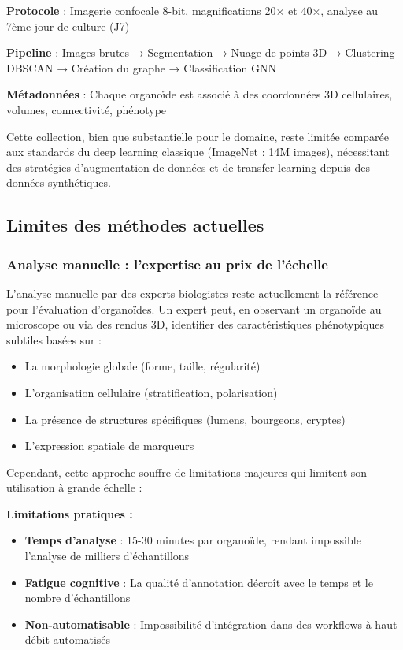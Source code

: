 \textbf{Protocole} : Imagerie confocale 8-bit, magnifications 20× et 40×, analyse au 7ème jour de culture (J7)

\textbf{Pipeline} : Images brutes → Segmentation → Nuage de points 3D → Clustering DBSCAN → Création du graphe → Classification GNN

\textbf{Métadonnées} : Chaque organoïde est associé à des coordonnées 3D cellulaires, volumes, connectivité, phénotype

Cette collection, bien que substantielle pour le domaine, reste limitée comparée aux standards du deep learning classique (ImageNet : 14M images), nécessitant des stratégies d'augmentation de données et de transfer learning depuis des données synthétiques.

\subsection{Limites des méthodes actuelles}

\subsubsection{Analyse manuelle : l'expertise au prix de l'échelle}

L'analyse manuelle par des experts biologistes reste actuellement la référence pour l'évaluation d'organoïdes. Un expert peut, en observant un organoïde au microscope ou via des rendus 3D, identifier des caractéristiques phénotypiques subtiles basées sur :
\begin{itemize}
    \item La morphologie globale (forme, taille, régularité)
    \item L'organisation cellulaire (stratification, polarisation)
    \item La présence de structures spécifiques (lumens, bourgeons, cryptes)
    \item L'expression spatiale de marqueurs
\end{itemize}

Cependant, cette approche souffre de limitations majeures qui limitent son utilisation à grande échelle :

\textbf{Limitations pratiques :}
\begin{itemize}
    \item \textbf{Temps d'analyse} : 15-30 minutes par organoïde, rendant impossible l'analyse de milliers d'échantillons
    \item \textbf{Fatigue cognitive} : La qualité d'annotation décroît avec le temps et le nombre d'échantillons
    \item \textbf{Non-automatisable} : Impossibilité d'intégration dans des workflows à haut débit automatisés
\end{itemize}

